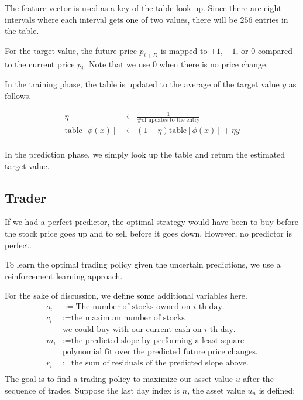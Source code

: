 \documentclass[twocolumn,10pt]{asme2ej}
\begin{document}
The feature vector is used as a key of the table look up. Since there
are eight intervals where each interval gets one of two values, there
will be $256$ entries in the table.

For the target value, the future price $p_{i+D}$ is mapped to $+1$,
$-1$, or $0$ compared to the current price $p_i$. Note that we use $0$
when there is no price change.

In the training phase, the table is updated to the average of the
target value $y$ as follows.

\begin{align*}
  \eta &\gets \frac{1}{\text{\# of updates to the entry}} \\
  \text{table}[\phi(x)] &\gets (1 - \eta)\text{table}[\phi(x)] + \eta y \\
\end{align*}

In the prediction phase, we simply look up the table and return the
estimated target value.

\subsection{Trader}

If we had a perfect predictor, the optimal strategy would have been to
buy before the stock price goes up and to sell before it goes
down. However, no predictor is perfect.

To learn the optimal trading policy given the uncertain predictions,
we use a reinforcement learning approach.

For the sake of discussion, we define some additional variables here.
\begin{align*}
  o_i &:= \text{The number of stocks owned on }i\text{-th day.} \\
  c_i &:= \text{the maximum number of stocks}\\
  & \text{we could buy with our current cash on }i\text{-th day.} \\
  m_i &:= \text{the predicted slope by performing a least square} \\
  & \text{polynomial fit over the predicted future price changes.} \\
  r_i &:= \text{the sum of residuals of the predicted slope above.} \\
\end{align*}
The goal is to find a trading policy to maximize our asset value $u$
after the sequence of trades. Suppose the last day index is $n$, the
asset value $u_n$ is defined:
\end{document}
